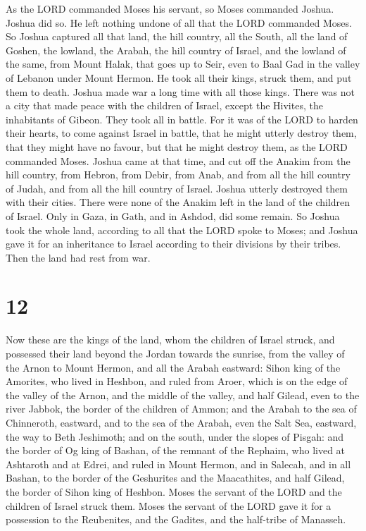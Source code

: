  As the LORD commanded Moses his servant, so Moses
commanded Joshua. Joshua did so. He left nothing undone of all that the
LORD commanded Moses.  So Joshua captured all that land,
the hill country, all the South, all the land of Goshen, the lowland,
the Arabah, the hill country of Israel, and the lowland of the same,
 from Mount Halak, that goes up to Seir, even to Baal Gad
in the valley of Lebanon under Mount Hermon. He took all their kings,
struck them, and put them to death.  Joshua made war a long
time with all those kings.  There was not a city that made
peace with the children of Israel, except the Hivites, the inhabitants
of Gibeon. They took all in battle.  For it was of the LORD
to harden their hearts, to come against Israel in battle, that he might
utterly destroy them, that they might have no favour, but that he might
destroy them, as the LORD commanded Moses.  Joshua came at
that time, and cut off the Anakim from the hill country, from Hebron,
from Debir, from Anab, and from all the hill country of Judah, and from
all the hill country of Israel. Joshua utterly destroyed them with their
cities.  There were none of the Anakim left in the land of
the children of Israel. Only in Gaza, in Gath, and in Ashdod, did some
remain.  So Joshua took the whole land, according to all
that the LORD spoke to Moses; and Joshua gave it for an inheritance to
Israel according to their divisions by their tribes. Then the land had
rest from war.

\hypertarget{section-11}{%
\section{12}\label{section-11}}

 Now these are the kings of the land, whom the children of
Israel struck, and possessed their land beyond the Jordan towards the
sunrise, from the valley of the Arnon to Mount Hermon, and all the
Arabah eastward:  Sihon king of the Amorites, who lived in
Heshbon, and ruled from Aroer, which is on the edge of the valley of the
Arnon, and the middle of the valley, and half Gilead, even to the river
Jabbok, the border of the children of Ammon;  and the Arabah
to the sea of Chinneroth, eastward, and to the sea of the Arabah, even
the Salt Sea, eastward, the way to Beth Jeshimoth; and on the south,
under the slopes of Pisgah:  and the border of Og king of
Bashan, of the remnant of the Rephaim, who lived at Ashtaroth and at
Edrei,  and ruled in Mount Hermon, and in Salecah, and in
all Bashan, to the border of the Geshurites and the Maacathites, and
half Gilead, the border of Sihon king of Heshbon.  Moses the
servant of the LORD and the children of Israel struck them. Moses the
servant of the LORD gave it for a possession to the Reubenites, and the
Gadites, and the half-tribe of Manasseh.

